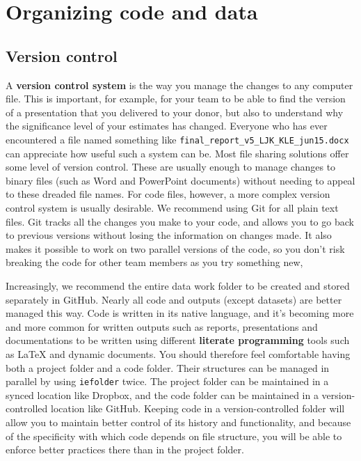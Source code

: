 \section{Organizing code and data}

\subsection{Version control}

A \textbf{version control system} is the way you manage the changes to any computer file.
This is important, for example, for your team to be able to find the version of a presentation that you delivered to your donor,
but also to understand why the significance level of your estimates has changed.
Everyone who has ever encountered a file named something like \texttt{final\_report\_v5\_LJK\_KLE\_jun15.docx}
can appreciate how useful such a system can be.
Most file sharing solutions offer some level of version control.
These are usually enough to manage changes to binary files (such as Word and PowerPoint documents) without needing to appeal to these dreaded file names.
For code files, however, a more complex version control system is usually desirable.
We recommend using Git for all plain text files.
Git tracks all the changes you make to your code,
and allows you to go back to previous versions without losing the information on changes made.
It also makes it possible to work on two parallel versions of the code,
so you don't risk breaking the code for other team members as you try something new,

Increasingly, we recommend the entire data work folder
to be created and stored separately in GitHub.
Nearly all code and outputs (except datasets) are better managed this way.
Code is written in its native language,
and it's becoming more and more common for written outputs such as reports,
presentations and documentations to be written using different \textbf{literate programming}
tools such as {\LaTeX} and dynamic documents.
You should therefore feel comfortable having both a project folder and a code folder.
Their structures can be managed in parallel by using \texttt{iefolder} twice.
The project folder can be maintained in a synced location like Dropbox,
and the code folder can be maintained in a version-controlled location like GitHub.
Keeping code in a version-controlled folder will allow you
to maintain better control of its history and functionality,
and because of the specificity with which code depends on file structure,
you will be able to enforce better practices there than in the project folder.


